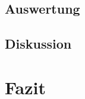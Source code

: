 \documentclass{acm_proc_article-sp}
\begin{document}
\subsection{Auswertung}


\subsection{Diskussion}


\section{Fazit}
\end{document}
